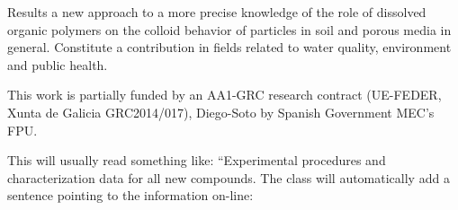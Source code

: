 \documentclass[journal=langd5,manuscript=article]{achemso}
\begin{document}
Results   a new approach to a more precise knowledge of the role of dissolved
organic polymers on the colloid behavior of particles  in soil and porous media in general. Constitute a contribution in fields related to 
water quality, environment and public health.



\begin{acknowledgement}

This
work is partially funded by an AA1-GRC research contract (UE-FEDER,
Xunta de Galicia GRC2014/017), Diego-Soto by Spanish Government MEC’s FPU.

\end{acknowledgement}

\begin{suppinfo}

This will usually read something like: ``Experimental procedures and
characterization data for all new compounds. The class will
automatically add a sentence pointing to the information on-line:

\end{suppinfo}


\end{document}
